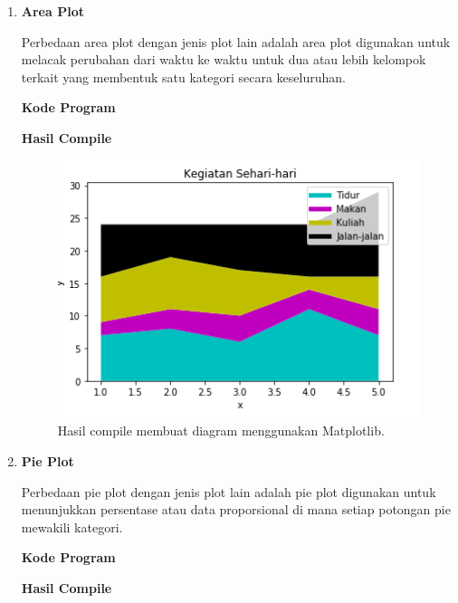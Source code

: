 \begin{enumerate}
	\item \textbf{Area Plot}
	
	Perbedaan area plot dengan jenis plot lain adalah area plot digunakan untuk melacak perubahan dari waktu ke waktu untuk dua atau lebih kelompok terkait yang membentuk satu kategori secara keseluruhan.
	
	\textbf{Kode Program}
	
	
	
	\textbf{Hasil Compile}
	
	\begin{figure}[H]
		\includegraphics[width=12cm]{figures/6/1174034/Teori/area.png}
		\centering
		\caption{Hasil compile membuat diagram menggunakan Matplotlib.}
	\end{figure}
	
	\item \textbf{Pie Plot}
	
	Perbedaan pie plot dengan jenis plot lain adalah pie plot digunakan untuk menunjukkan persentase atau data proporsional di mana setiap potongan pie mewakili kategori.
	
	\textbf{Kode Program}
	
	
	
	\textbf{Hasil Compile}
	

\end{enumerate}
